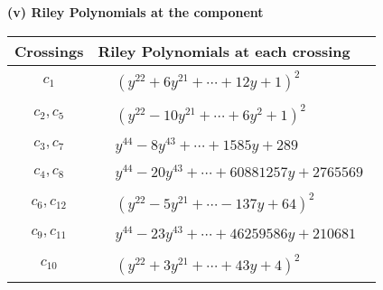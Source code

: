 \documentclass[1p]{elsarticle_modified}
\theoremstyle{definition}
\begin{document}
\flushleft \textbf{(v) Riley Polynomials at the component}\newline \\
\begin{tabular}{m{50pt}|m{274pt}}
Crossings & \hspace{64pt}Riley Polynomials at each crossing \\
\hline $$\begin{aligned}c_{1}\end{aligned}$$&$\begin{aligned}
&(y^{22}+6 y^{21}+\cdots+12 y+1)^{2}
\end{aligned}$\\
\hline $$\begin{aligned}c_{2},c_{5}\end{aligned}$$&$\begin{aligned}
&(y^{22}-10 y^{21}+\cdots+6 y^2+1)^{2}
\end{aligned}$\\
\hline $$\begin{aligned}c_{3},c_{7}\end{aligned}$$&$\begin{aligned}
&y^{44}-8 y^{43}+\cdots+1585 y+289
\end{aligned}$\\
\hline $$\begin{aligned}c_{4},c_{8}\end{aligned}$$&$\begin{aligned}
&y^{44}-20 y^{43}+\cdots+60881257 y+2765569
\end{aligned}$\\
\hline $$\begin{aligned}c_{6},c_{12}\end{aligned}$$&$\begin{aligned}
&(y^{22}-5 y^{21}+\cdots-137 y+64)^{2}
\end{aligned}$\\
\hline $$\begin{aligned}c_{9},c_{11}\end{aligned}$$&$\begin{aligned}
&y^{44}-23 y^{43}+\cdots+46259586 y+210681
\end{aligned}$\\
\hline $$\begin{aligned}c_{10}\end{aligned}$$&$\begin{aligned}
&(y^{22}+3 y^{21}+\cdots+43 y+4)^{2}
\end{aligned}$\\
\hline
\end{tabular}\\~\\
\end{document}

